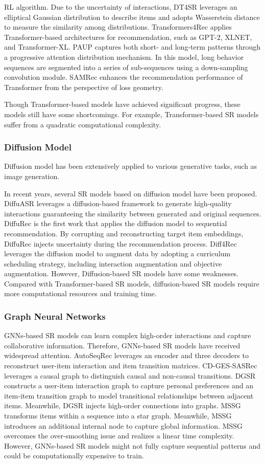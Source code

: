 \documentclass[review]{fcs}
\begin{document}
RL algorithm. Due to the uncertainty of interactions, DT4SR \cite{DT4SR} leverages an elliptical Gaussian distribution to describe items and adopts Wasserstein distance to measure the similarity among distributions. Transformers4Rec \cite{Transformers4rec} applies Transformer-based architectures for recommendation, such as GPT-2, XLNET, and Transformer-XL. PAUP \cite{PAUP} captures both short- and long-term patterns through a progressive attention distribution mechanism. In this model,  long behavior sequences are segmented into a series of sub-sequences using a down-sampling convolution module. SAMRec \cite{SAMRec} enhances the recommendation performance of Transformer from the perspective of loss geometry.
	
	Though Transformer-based models have achieved significant progress, these models still have some shortcomings. For example, Transformer-based SR models suffer from a quadratic computational complexity.
	\subsubsection{Diffusion Model}
	Diffusion model has been extensively applied to various generative tasks, such as image generation.
	
	In recent years, several SR models based on diffusion model have been proposed. DiffuASR \cite{DiffuASR} leverages a diffusion-based framework to generate high-quality interactions guaranteeing the similarity between generated and original sequences. DiffuRec \cite{DiffuRec} is the first work that applies the diffusion model to sequential recommendation. By corrupting and reconstructing target item embeddings, DiffuRec \cite{DiffuRec} injects uncertainty during the recommendation process. Diff4Rec \cite{Diff4Rec}  leverages the diffusion model to augment data by adopting a curriculum scheduling strategy, including interaction augmentation and objective augmentation. However, Diffusion-based SR models have some weaknesses. Compared with Transformer-based SR models, diffusion-based SR models require more computational resources and training time.
	\subsubsection{Graph Neural Networks}
	GNNs-based SR models can learn complex high-order interactions and capture collaborative information. Therefore, GNNs-based SR models have received widespread attention. AutoSeqRec \cite{AutoSeqRec} leverages an encoder and three decoders to reconstruct user-item interaction and item transition matrices. CD-GES-SASRec \cite{CD-GES-SASRec} leverages a causal graph to distinguish causal and non-causal transitions. DGSR \cite{DGSR} constructs a user-item interaction graph to capture personal preferences and an item-item transition graph to model transitional relationships between adjacent items. Meanwhile, DGSR \cite{DGSR} injects high-order connections into graphs. MSSG \cite{MSSG} transforms items within a sequence into a star graph. Meanwhile, MSSG introduces an additional internal node to capture global information. MSSG overcomes the over-smoothing issue and realizes a linear time complexity. However, GNNs-based SR models might not fully capture sequential patterns and could be computationally expensive to train.
\end{document}
